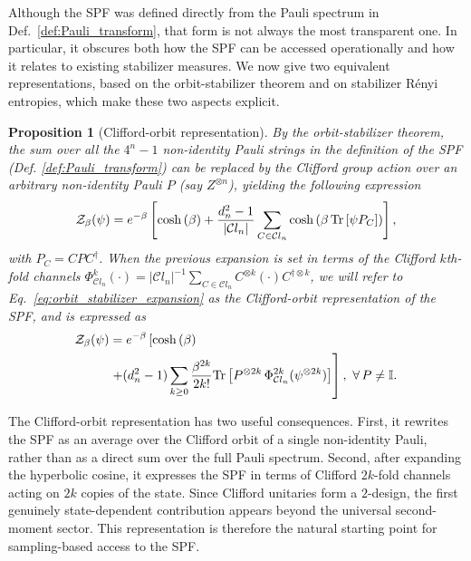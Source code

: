 \documentclass[aps,pra,superscriptaddress,twocolumn,longbibliography]{revtex4-2}
\newcommand{\tr}{{\rm Tr}}
\newtheorem{proposition}{Proposition}
\begin{document}
Although the SPF was defined directly from the Pauli spectrum in Def.~\ref{def:Pauli_transform}, that form is not always the most transparent one. In particular, it obscures both how the SPF can be accessed operationally and how it relates to existing stabilizer measures. We now give two equivalent representations, based on the orbit-stabilizer theorem and on stabilizer R\'enyi entropies, which make these two aspects explicit.

\begin{proposition}[Clifford-orbit representation]

By the orbit-stabilizer theorem, the sum over all the $4^{n}-1$ non-identity Pauli strings in the definition of the SPF (Def. \ref{def:Pauli_transform}) can be replaced by the Clifford group action over an arbitrary non-identity Pauli $P$ (say $Z^{\otimes n}$), yielding the following expression 
%
\begin{align}
\label{eq:orbit_stabilizer_expansion}
    \mathcal{Z}_{\beta}(\psi)=e^{-\beta}\left[\cosh{(\beta)}
    +\frac{d_{n}^{2}-1}{|\mathcal{C}l_{n}|}\sum_{C \in \mathcal{C}l_{n}}\cosh{\left(\beta\,\tr\left[\psi P_{C}\right]\right)}\right],
\end{align}
%
with $P_{C}=CPC^{\dagger}$. When the previous expansion is set in terms of the Clifford $k$th-fold channels $\Phi^{k}_{\mathcal{C}l_{n}}(\cdot)=|\mathcal{C}l_{n}|^{-1}\sum_{C\in \mathcal{C}l_{n}}C^{\otimes k}(\cdot) C^{\dagger \otimes k}$, we will refer to Eq.~\eqref{eq:orbit_stabilizer_expansion} as the Clifford-orbit representation of the SPF, and is expressed as
%
\begin{align}
\label{eq:Clifford_representation_P_transform}
    \mathcal{Z}_{\beta}(\psi)&=e^{-\beta}\left[\cosh{(\beta)}\right.\\ \nonumber
    &\left.+(d_{n}^{2}-1)\sum_{k \geq 0}\frac{\beta^{2k}}{2k!}\tr\left[P^{\otimes 2k}\, \Phi^{2k}_{\mathcal{C}l_{n}}(\psi^{\otimes 2k})\right]\right], \,\, \forall \, P \neq \mathbb{I}.
\end{align}

\end{proposition}
%
The Clifford-orbit representation has two useful consequences. First, it rewrites the SPF as an average over the Clifford orbit of a single non-identity Pauli, rather than as a direct sum over the full Pauli spectrum. Second, after expanding the hyperbolic cosine, it expresses the SPF in terms of Clifford $2k$-fold channels acting on $2k$ copies of the state. Since Clifford unitaries form a $2$-design, the first genuinely state-dependent contribution appears beyond the universal second-moment sector. This representation is therefore the natural starting point for sampling-based access to the SPF.
\end{document}
